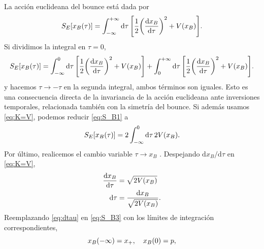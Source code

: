 La acción euclideana del bounce está dada por %
\begin{equation}\label{eq:S_B1}
S_E\qty[x_B\qty(\tau)] =  \int_{-\infty}^{+\infty} \dd{\tau} \qty[ \frac{1}{2}\qty(\dv{x_B}{\tau})^2 + V\qty(x_B) ]. 
\end{equation}
Si dividimos la integral en $\tau = 0$,
\begin{equation}\label{eq:S_B_tau0}
S_E\qty[x_B\qty(\tau)] =  \int_{-\infty}^{0} \dd{\tau} \qty[ \frac{1}{2}\qty(\dv{x_B}{\tau})^2 + V\qty(x_B) ] +   \int_{0}^{+\infty} \dd{\tau} \qty[ \frac{1}{2}\qty(\dv{x_B}{\tau})^2 + V\qty(x_B) ]. 
\end{equation}
y hacemos $\tau \rightarrow -\tau$ en la segunda integral, ambos términos son iguales. %
Esto es una consecuencia directa de la invariancia de la acción euclideana ante inversiones temporales, relacionada también con la simetría del bounce. Si además usamos \eqref{eq:K=V}, podemos reducir \eqref{eq:S_B1} a
\begin{equation} \label{eq:S_B3}
S_E\qty[x_B\qty(\tau)] = 2\int_{-\infty}^{0} \dd{\tau} 2 V\qty(x_B).
\end{equation}
Por último, realicemos el cambio variable $\tau \rightarrow x_B$ \cite{rubakov2009classical}. Despejando $\text{d}x_B/\text{d}\tau$ en \eqref{eq:K=V}, %
\begin{align}
\dv{x_B}{\tau} &= \sqrt{2V\qty(x_B)} \\  \label{eq:dtau}
\dd{\tau} &= \frac{\dd{x_B}}{\sqrt{2V(x_B)}}.
\end{align}
Reemplazando \eqref{eq:dtau} en \eqref{eq:S_B3} con los límites de integración correspondientes,
\begin{equation}
x_B\qty(-\infty) = x_+, \quad x_B\qty(0) = p,
\end{equation}
